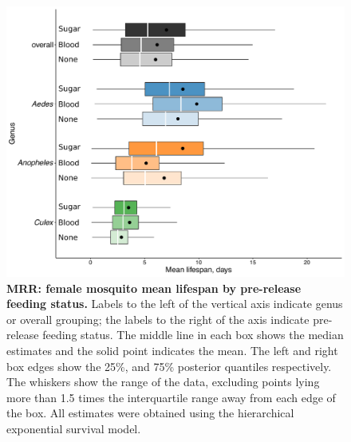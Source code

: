\documentclass[12pt]{article}
\begin{document}
\begin{figure}[h]
	\centerline{\includegraphics[width=1\textwidth]{./Figure_files/mrr_female_blood_sugar_inkscaped.pdf}}
	\caption{\textbf{MRR: female mosquito mean lifespan by pre-release feeding status.} Labels to the left of the vertical axis indicate genus or overall grouping; the labels to the right of the axis indicate pre-release feeding status. The middle line in each box shows the median estimates and the solid point indicates the mean. The left and right box edges show the 25\%, and 75\% posterior quantiles respectively. The whiskers show the range of the data, excluding points lying more than 1.5 times the interquartile range away from each edge of the box. All estimates were obtained using the hierarchical exponential survival model.}
	\label{fig:mrr_female_blood_sugar}
\end{figure}
\end{document}
